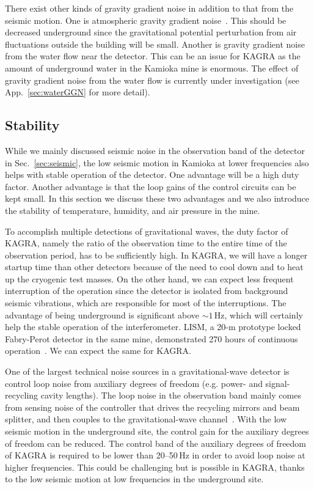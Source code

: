 \documentclass[prd ,twocolumn ,secnumarabic,dvips
,amssymb, amsmath,nobibnotes, aps, prd,superscriptaddress]{revtex4-1}
\begin{document}
{There exist other kinds of gravity gradient noise in addition to that from the seismic motion. One is atmospheric gravity gradient noise~\cite{airGGN}. 
This should be decreased underground since the gravitational potential perturbation from air fluctuations  outside the building will be small. 
Another is gravity gradient noise from the water flow near the detector. This can be an issue for KAGRA as the amount of underground water in the Kamioka mine is enormous. The effect of gravity gradient noise from the water flow is currently under investigation (see App.~\ref{sec:waterGGN} for more detail).

\subsection{Stability}
%
While we mainly discussed seismic noise in the observation band of the detector in Sec.~\ref{sec:seismic}, the low seismic motion in Kamioka at lower frequencies also helps with stable operation of the detector. One advantage will be a high duty factor. 
Another advantage is that the loop gains of the control circuits can be kept small. In this section we discuss these two advantages and we also introduce the stability of temperature, humidity, and air pressure in the mine.

To accomplish multiple detections of gravitational waves, the duty factor of KAGRA, namely the ratio of the observation time to the entire time of the observation period, has to be sufficiently high. In KAGRA, we will have a longer startup time than other detectors because of the need to cool down and to heat up the cryogenic test masses. On the other hand, we can expect less frequent interruption of the operation since the detector is isolated from background seismic vibrations, which are responsible for most of the interruptions. The advantage of being underground is significant above $\sim1\,\mathrm{Hz}$, which will certainly help the stable operation of the interferometer. LISM, a 20-m prototype locked Fabry-Perot detector in the same mine, demonstrated 270 hours of continuous operation~\cite{LISM}. We can expect the same for KAGRA.

One of the largest technical noise sources in a gravitational-wave detector is control loop noise from auxiliary degrees of freedom (e.g. power- and signal-recycling cavity lengths). The loop noise in the observation band mainly comes from sensing noise of the controller that drives the recycling mirrors and beam splitter, and then couples to the gravitational-wave channel~\cite{loopnoise}. With the low seismic motion in the underground site, the control gain for the auxiliary degrees of freedom can be reduced. The control band of the auxiliary degrees of freedom of KAGRA is required to be lower than 20--50\,Hz in order to avoid loop noise at higher frequencies. This could be challenging but is possible in KAGRA, thanks to the low seismic motion at low frequencies in the underground site.

}
\end{document}

